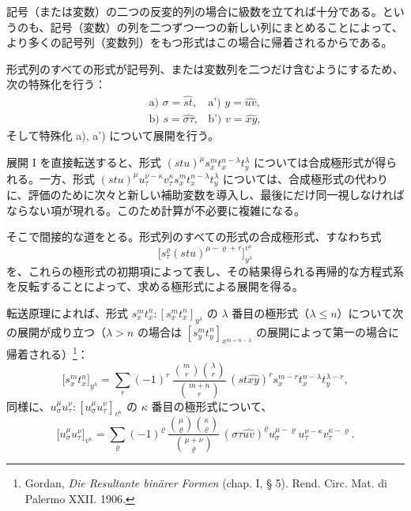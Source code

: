 \documentclass[11pt]{jlreq}
\begin{document}
記号（または変数）の二つの反変的列の場合に級数を立てれば十分である。というのも、記号（変数）の列を二つずつ一つの新しい列にまとめることによって、より多くの記号列（変数列）をもつ形式はこの場合に帰着されるからである。

形式列のすべての形式が記号列、または変数列を二つだけ含むようにするため、次の特殊化を行う：
\[
\begin{array}{ll}
\text{a) } \sigma=\widehat{st}, & \text{a') } y=\widehat{uv},\\[0.3em]
\text{b) } s=\widehat{\sigma\tau}, & \text{b') } v=\widehat{xy},
\end{array}
\]
そして特殊化 a), a') について展開を行う。

展開 I を直接転送すると、形式 $(stu)^\mu s_x^m t_x^{n-\lambda}t_y^\lambda$ については合成極形式が得られる。一方、形式 $(stu)^\mu u_\tau^{\nu-\kappa}v_\tau^\kappa s_x^m t_x^{n-\lambda}t_y^\lambda$ については、合成極形式の代わりに、評価のために次々と新しい補助変数を導入し、最後にだけ同一視しなければならない項が現れる。このため計算が不必要に複雑になる。

そこで間接的な道をとる。形式列のすべての形式の合成極形式、すなわち式
\[
\bigl[s_\tau^\varrho(stu)^{\mu-\varrho+r}\bigr]_{y^\lambda}^{v^\kappa}
\]
を、これらの極形式の初期項によって表し、その結果得られる再帰的な方程式系を反転することによって、求める極形式による展開を得る。

転送原理によれば、形式 $s_x^m t_x^n:[s_x^m t_x^n]_{y^\lambda}$ の $\lambda$ 番目の極形式（$\lambda\le n$）について次の展開が成り立つ（$\lambda>n$ の場合は $[s_y^m t_y^n]_{x^{m+n-\lambda}}$ の展開によって第一の場合に帰着される）\footnote{Gordan, \emph{Die Resultante binärer Formen} (chap. I, § 5). Rend. Circ. Mat. di Palermo XXII. 1906.}：
\[
\bigl[s_x^m t_x^n\bigr]_{y^\lambda}
=\sum_r (-1)^r\,
\frac{\binom{m}{r}\binom{\lambda}{r}}{\binom{m+n}{r}}\,
(st\widehat{xy})^r s_x^{m-r}t_x^{n-\lambda}t_y^{\lambda-r},
\]
同様に、$u_\sigma^\mu u_\tau^\nu:[u_\sigma^\mu u_\tau^\nu]_{v^\kappa}$ の $\kappa$ 番目の極形式について、
\[
\bigl[u_\sigma^\mu u_\tau^\nu\bigr]_{v^\kappa}
=\sum_\varrho (-1)^\varrho\,
\frac{\binom{\mu}{\varrho}\binom{\kappa}{\varrho}}{\binom{\mu+\nu}{\varrho}}\,
(\sigma\tau\widehat{uv})^\varrho u_\sigma^{\mu-\varrho}u_\tau^{\nu-\kappa}v_\tau^{\kappa-\varrho}.
\]
\end{document}
